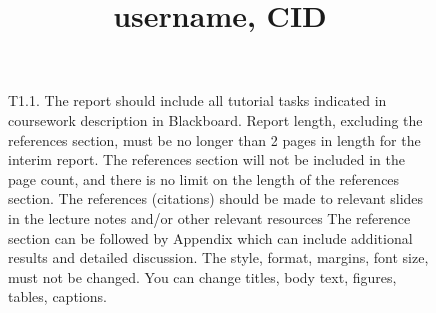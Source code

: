 \documentclass[10pt,twocolumn,letterpaper]{article}
\begin{document}
\title{username, CID}



\maketitle









\begin{figure}[h]
\begin{center}
\fbox{\rule{0pt}{1.2in} \rule{0.99\linewidth}{0pt}}
\end{center}
   \caption{T1.1. The report should include all tutorial tasks indicated in coursework description in Blackboard. Report length, excluding the references section,
must be no longer than 2 pages in length for the interim report. The references section
will not be included in the page count, and there is no limit on the
length of the references section. The references (citations) should be made to relevant slides in the lecture notes and/or other relevant resources
The reference section can be followed by Appendix which can include additional results and detailed discussion. 
The style, format, margins, font size, must not be changed. 
You can change titles, body text, figures,  tables, captions.}
\label{fig:1}
\end{figure}




\end{document}

